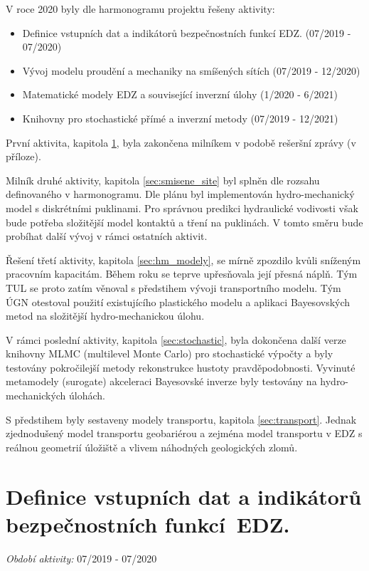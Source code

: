 \documentclass[11pt,a4paper]{article}
\begin{document}
\begin{onehalfspacing}
V roce 2020 byly dle harmonogramu projektu řešeny
aktivity:
\begin{itemize}
\item Definice vstupních dat a indikátorů bezpečnostních funkcí EDZ. (07/2019 - 07/2020)

\item Vývoj modelu proudění a mechaniky na smíšených sítích (07/2019 - 12/2020)

\item Matematické modely EDZ a související inverzní úlohy (1/2020 - 6/2021)

\item Knihovny pro stochastické přímé a inverzní metody (07/2019 - 12/2021)
\end{itemize}

 První aktivita, kapitola \ref{sec:indikatory}, byla zakončena milníkem v podobě rešeršní zprávy (v příloze). 

Milník druhé aktivity, kapitola \ref{sec:smisene_site} byl splněn dle rozsahu definovaného v harmonogramu.
Dle plánu byl implementován hydro-mechanický model s diskrétními puklinami. 
Pro správnou predikci hydraulické vodivosti však bude potřeba složitější model kontaktů a tření na puklinách. V tomto směru bude probíhat další vývoj v rámci ostatních aktivit. 

Řešení třetí aktivity, kapitola \ref{sec:hm_modely}, se mírně zpozdilo kvůli sníženým pracovním kapacitám. Během roku se teprve upřesňovala její přesná náplň. Tým TUL
se proto zatím věnoval s předstihem vývoji transportního modelu. Tým ÚGN otestoval 
použití existujícího plastického modelu a aplikaci Bayesovských metod na složitější hydro-mechanickou úlohu.

V rámci poslední aktivity, kapitola \ref{sec:stochastic}, byla dokončena další verze knihovny MLMC (multilevel Monte Carlo) pro stochastické výpočty a byly testovány pokročilejší metody rekonstrukce hustoty 
pravděpodobnosti. Vyvinuté metamodely (surogate) akceleraci Bayesovské inverze byly testovány na hydro-mechanických úlohách.

S předstihem byly sestaveny modely transportu, kapitola \ref{sec:transport}. Jednak zjednodušený model transportu geobariérou a zejména model transportu v EDZ s reálnou geometrií úložiště a vlivem náhodných geologických zlomů.
 

\section[Definice indikátorů bezpečnostních funkcí EDZ.]{Definice vstupních dat 
a indikátorů bezpečnostních funkcí~EDZ.}
\label{sec:indikatory}
{\it Období aktivity:}  07/2019 - 07/2020


\end{onehalfspacing}
\end{document}
